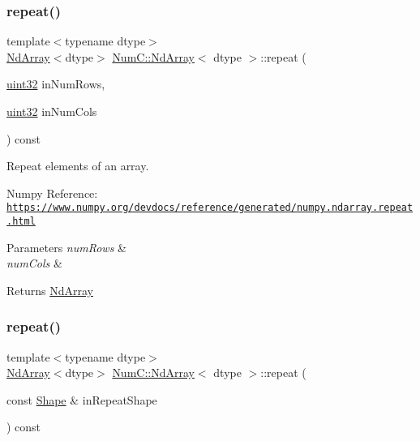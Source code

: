 \subsubsection{\texorpdfstring{repeat()}{repeat()}\hspace{0.1cm}{\footnotesize\ttfamily [1/2]}}
{\footnotesize\ttfamily template$<$typename dtype$>$ \\
\mbox{\hyperlink{class_num_c_1_1_nd_array}{Nd\+Array}}$<$dtype$>$ \mbox{\hyperlink{class_num_c_1_1_nd_array}{Num\+C\+::\+Nd\+Array}}$<$ dtype $>$\+::repeat (\begin{DoxyParamCaption}\item[{\mbox{\hyperlink{namespace_num_c_ae685802ca6d3035f2b400b081e3953fa}{uint32}}}]{in\+Num\+Rows,  }\item[{\mbox{\hyperlink{namespace_num_c_ae685802ca6d3035f2b400b081e3953fa}{uint32}}}]{in\+Num\+Cols }\end{DoxyParamCaption}) const\hspace{0.3cm}{\ttfamily [inline]}}

Repeat elements of an array.

Numpy Reference\+: \href{https://www.numpy.org/devdocs/reference/generated/numpy.ndarray.repeat.html}{\tt https\+://www.\+numpy.\+org/devdocs/reference/generated/numpy.\+ndarray.\+repeat.\+html}


\begin{DoxyParams}{Parameters}
{\em num\+Rows} & \\
\hline
{\em num\+Cols} & \\
\hline
\end{DoxyParams}
\begin{DoxyReturn}{Returns}
\mbox{\hyperlink{class_num_c_1_1_nd_array}{Nd\+Array}} 
\end{DoxyReturn}
\mbox{\label{class_num_c_1_1_nd_array_afe4566bcc50f89abad438ff8606dc735}} 
\subsubsection{\texorpdfstring{repeat()}{repeat()}\hspace{0.1cm}{\footnotesize\ttfamily [2/2]}}
{\footnotesize\ttfamily template$<$typename dtype$>$ \\
\mbox{\hyperlink{class_num_c_1_1_nd_array}{Nd\+Array}}$<$dtype$>$ \mbox{\hyperlink{class_num_c_1_1_nd_array}{Num\+C\+::\+Nd\+Array}}$<$ dtype $>$\+::repeat (\begin{DoxyParamCaption}\item[{const \mbox{\hyperlink{class_num_c_1_1_shape}{Shape}} \&}]{in\+Repeat\+Shape }\end{DoxyParamCaption}) const\hspace{0.3cm}{\ttfamily [inline]}}


